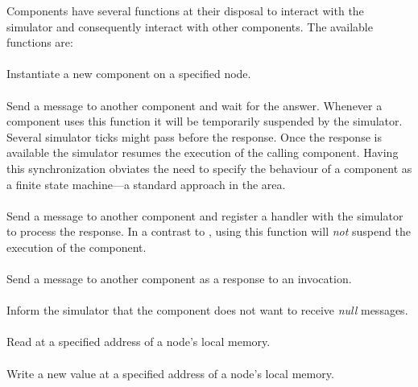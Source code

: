 Components have several functions at their disposal to interact with the simulator and consequently interact with other components.
The available functions are:

\paragraph{}
Instantiate a new component on a specified node.
\paragraph{}
Send a message to another component and wait for the answer.
Whenever a component uses this function it will be temporarily suspended by the simulator.
Several simulator ticks might pass before the response.
Once the response is available the simulator resumes the execution of the calling component.
Having this synchronization obviates the need to specify the behaviour of a component as a finite state machine---a standard approach in the area.
\paragraph{}
Send a message to another component and register a handler with the simulator to process the response.
In a contrast to , using this function will \emph{not} suspend the execution of the component.
\paragraph{}
Send a message to another component as a response to an invocation.
\paragraph{}
Inform the simulator that the component does not want to receive \emph{null} messages.
\paragraph{}
Read at a specified address of a node's local memory.
\paragraph{}
Write a new value at a specified address of a node's local memory.
